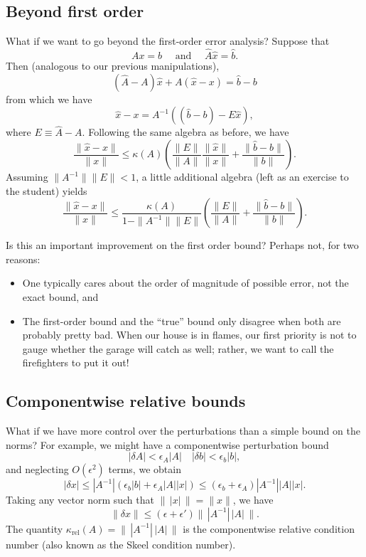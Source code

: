 \subsection{Beyond first order}

What if we want to go beyond the first-order error analysis?
Suppose that
\[
  Ax = b \quad \mbox{ and } \quad \hat{A} \hat{x} = \hat{b}.
\]
Then (analogous to our previous manipulations),
\[
  (\hat{A}-A) \hat{x} + A(\hat{x}-x) = \hat{b}-b
\]
from which we have
\[
  \hat{x}-x = A^{-1} \left( (\hat{b}-b) - E \hat{x} \right),
\]
where $E \equiv \hat{A}-A$.  Following the same algebra as before,
we have
\[
  \frac{\|\hat{x}-x\|}{\|x\|} \leq
  \kappa(A) \left(
    \frac{\|E\|}{\|A\|} \frac{\|\hat{x}\|}{\|x\|} +
    \frac{\|\hat{b}-b\|}{\|b\|}
  \right).
\]
Assuming $\|A^{-1}\| \|E\| < 1$, a little additional algebra
(left as an exercise to the student) yields
\[
\frac{\|\hat{x}-x\|}{\|x\|} \leq
\frac{\kappa(A)}{1-\|A^{-1}\|\|E\|} \left(
  \frac{\|E\|}{\|A\|} +
  \frac{\|\hat{b}-b\|}{\|b\|}
\right).
\]

Is this an important improvement on the first order bound?
Perhaps not, for two reasons:
\begin{itemize}
\item One typically cares about the order of magnitude of possible error,
  not the exact bound, and
\item The first-order bound and the ``true'' bound only disagree when
  both are probably pretty bad.  When our house is in flames, our first
  priority is not to gauge whether the garage will catch as well;
  rather, we want to call the firefighters to put it out!
\end{itemize}

\subsection{Componentwise relative bounds}

What if we have more control over the perturbations than a simple bound
on the norms?  For example, we might have a componentwise perturbation
bound
\[
  |\delta A| < \epsilon_A |A| \quad |\delta b| < \epsilon_b |b|,
\]
and neglecting $O(\epsilon^2)$ terms, we obtain
\[
  |\delta x|
  \leq |A^{-1}| \left( \epsilon_b |b| + \epsilon_A |A| |x| \right)
  \leq (\epsilon_b+\epsilon_A) |A^{-1}| |A| |x|.
\]
Taking any vector norm such that $\|\,|x|\,\|=\|x\|$, we have
\[
  \|\delta x\| \leq (\epsilon + \epsilon') \| \, |A^{-1}| \, |A| \, \|.
\]
The quantity
$\kappa_{\mathrm{rel}}(A) = \| \, |A^{-1}| \, |A| \, \|$ is the
componentwise relative condition number (also known as the Skeel
condition number).

